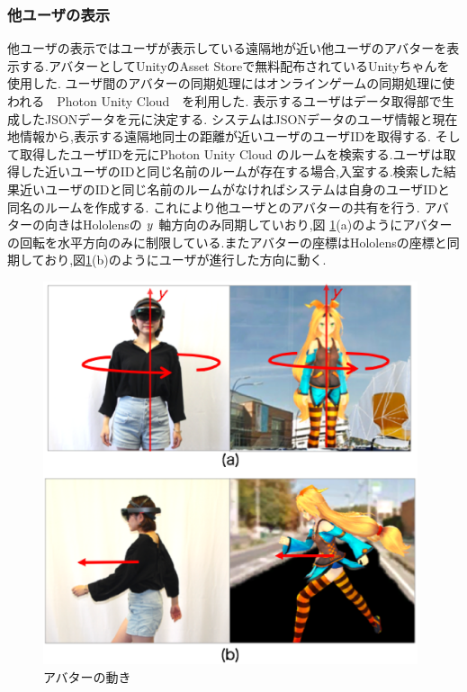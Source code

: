 \subsubsection{他ユーザの表示}
他ユーザの表示ではユーザが表示している遠隔地が近い他ユーザのアバターを表示する.アバターとしてUnityのAsset Storeで無料配布されているUnityちゃんを使用した\cite{unitychan}.
ユーザ間のアバターの同期処理にはオンラインゲームの同期処理に使われる　Photon Unity Cloud　を利用した\cite{photon}.
表示するユーザはデータ取得部で生成したJSONデータを元に決定する.
システムはJSONデータのユーザ情報と現在地情報から,表示する遠隔地同士の距離が近いユーザのユーザIDを取得する.
そして取得したユーザIDを元にPhoton Unity Cloud のルームを検索する.ユーザは取得した近いユーザのIDと同じ名前のルームが存在する場合,入室する.検索した結果近いユーザのIDと同じ名前のルームがなければシステムは自身のユーザIDと同名のルームを作成する.
これにより他ユーザとのアバターの共有を行う.
アバターの向きはHololensの
$\it{y}$
軸方向のみ同期していおり,図 \ref{figure:abatar}(a)のようにアバターの回転を水平方向のみに制限している.またアバターの座標はHololensの座標と同期しており,図\ref{figure:abatar}(b)のようにユーザが進行した方向に動く.

\begin{figure}[h]
\begin{center}
\includegraphics[width=11cm]{img/04_detail/avatar_move.eps} 
\end{center}
\caption{アバターの動き}
\label{figure:abatar}
\end{figure} 

